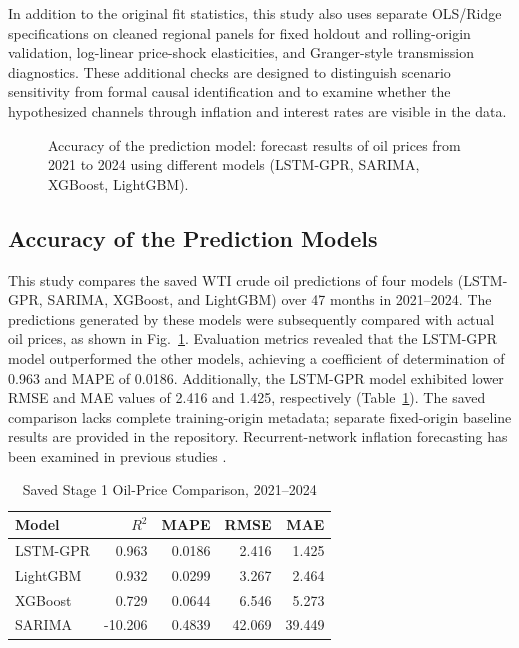 In addition to the original fit statistics, this study also uses separate OLS/Ridge specifications on cleaned regional panels for fixed holdout and rolling-origin validation, log-linear price-shock elasticities, and Granger-style transmission diagnostics. These additional checks are designed to distinguish scenario sensitivity from formal causal identification and to examine whether the hypothesized channels through inflation and interest rates are visible in the data.

\begin{figure}[t]
    \centering
    \caption{Accuracy of the prediction model: forecast results of oil prices from 2021 to 2024 using different models (LSTM-GPR, SARIMA, XGBoost, LightGBM).}
    \label{fig:accuracy}
\end{figure}

\subsection{Accuracy of the Prediction Models}
This study compares the saved WTI crude oil predictions of four models (LSTM-GPR, SARIMA, XGBoost, and LightGBM) over 47 months in 2021--2024. The predictions generated by these models were subsequently compared with actual oil prices, as shown in Fig.~\ref{fig:accuracy}. Evaluation metrics revealed that the LSTM-GPR model outperformed the other models, achieving a coefficient of determination of 0.963 and MAPE of 0.0186. Additionally, the LSTM-GPR model exhibited lower RMSE and MAE values of 2.416 and 1.425, respectively (Table~\ref{tab:stage1-accuracy}). The saved comparison lacks complete training-origin metadata; separate fixed-origin baseline results are provided in the repository. Recurrent-network inflation forecasting has been examined in previous studies \cite{PARANHOS2025}.

\begin{table}[t]
\centering
\caption{Saved Stage 1 Oil-Price Comparison, 2021--2024}
\label{tab:stage1-accuracy}
\scriptsize
\begin{tabular}{lrrrr}
\toprule
\textbf{Model} & \textbf{$R^2$} & \textbf{MAPE} & \textbf{RMSE} & \textbf{MAE} \\
\midrule
LSTM-GPR & 0.963 & 0.0186 & 2.416 & 1.425 \\
LightGBM & 0.932 & 0.0299 & 3.267 & 2.464 \\
XGBoost & 0.729 & 0.0644 & 6.546 & 5.273 \\
SARIMA & -10.206 & 0.4839 & 42.069 & 39.449 \\
\bottomrule
\end{tabular}
\end{table}
